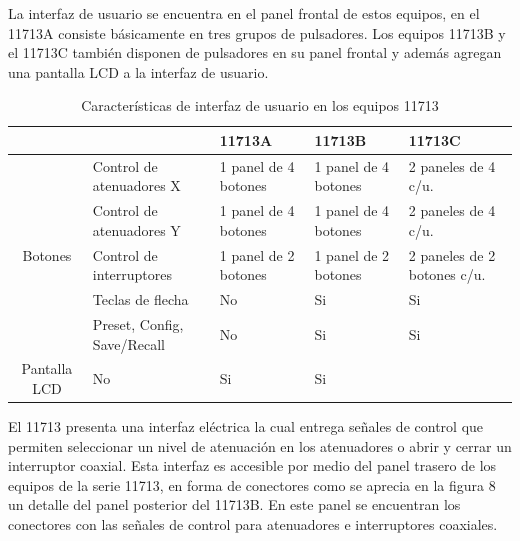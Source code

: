 La interfaz de usuario se encuentra en el panel frontal de estos equipos, en el 11713A consiste básicamente en tres grupos de pulsadores. Los equipos 11713B y el 11713C también disponen de pulsadores en su panel frontal y además agregan una pantalla LCD a la interfaz de usuario.

\begin{table}[h!]
	\begin{tabularx}{\textwidth}{cXXXX}
		\toprule
			&	&	11713A	&	11713B	&	11713C \\
		\midrule
		\multirow{5}{*}{Botones} & Control de \newline atenuadores X & 1 panel de 4 botones & 1 panel de 4 botones & 2 paneles de 4 c/u. \\
			&	Control de \newline atenuadores Y & 1 panel de 4 botones & 1 panel de 4 botones & 2 paneles de 4 c/u. \\
			& 	Control de \newline interruptores & 1 panel de 2 botones &  1 panel de 2 botones & 2 paneles de 2 botones c/u. \\
			& 	Teclas de flecha 	&	No	& Si	& Si \\
			& 	Preset, Config, Save/Recall	& No	&	Si	& Si \\
		\midrule
		Pantalla LCD	& No	& Si	& Si
	\end{tabularx}
	\caption{Características de interfaz de usuario en los equipos 11713}
	\label{Tab:CaracteristicasInterfazUsuario11713}
\end{table}


El 11713 presenta una interfaz eléctrica la cual entrega señales de control que permiten seleccionar un nivel de atenuación en los atenuadores o abrir y cerrar un interruptor coaxial. Esta interfaz es accesible por medio del panel trasero de los equipos de la serie 11713, en forma de conectores como se aprecia en la figura 8 un detalle del panel posterior del 11713B. En este panel se encuentran los conectores con las señales de control para atenuadores e interruptores coaxiales. 

